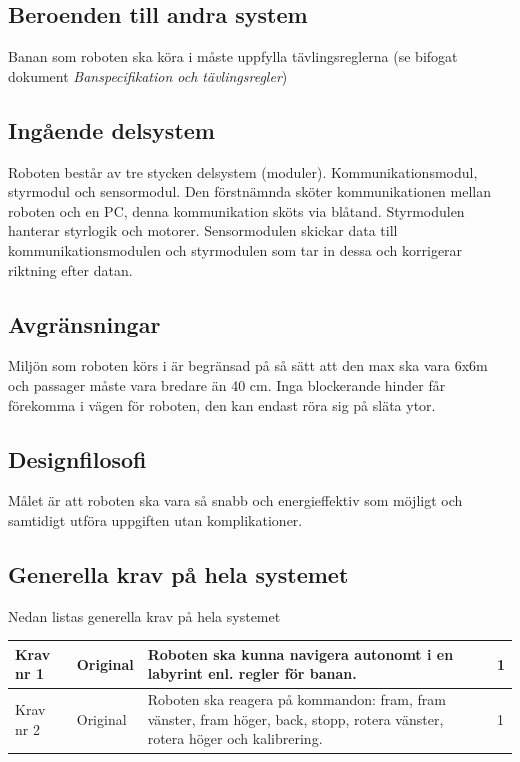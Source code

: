 \documentclass[11pt]{article}
\begin{document}
\begin{flushleft}
\subsection{Beroenden till andra system}
Banan som roboten ska köra i måste uppfylla tävlingsreglerna (se bifogat dokument \textit{Banspecifikation och tävlingsregler})

\subsection{Ingående delsystem}
Roboten består av tre stycken delsystem (moduler). Kommunikationsmodul, styrmodul och sensormodul. Den förstnämnda sköter kommunikationen mellan roboten och en PC, denna kommunikation sköts via blåtand. Styrmodulen hanterar styrlogik och motorer. Sensormodulen skickar data till kommunikationsmodulen och styrmodulen som tar in dessa och korrigerar riktning efter datan.

\subsection{Avgränsningar}
Miljön som roboten körs i är begränsad på så sätt att den max ska vara 6x6m och passager måste vara bredare än 40 cm. Inga blockerande hinder får förekomma i vägen för roboten, den kan endast röra sig på släta ytor.

\subsection{Designfilosofi}
Målet är att roboten ska vara så snabb och energieffektiv som möjligt och samtidigt utföra uppgiften utan komplikationer. 

\subsection{Generella krav på hela systemet}
Nedan listas generella krav på hela systemet
\\
\begin{center}
\begin{longtable}{|l|l|p{.70\linewidth}|l|} \hline

Krav nr 1 & 
Original & 
Roboten ska kunna navigera autonomt i en labyrint enl. regler för banan. & 
1 \\ \hline

Krav nr 2 & 
Original & 
Roboten ska reagera på kommandon: fram, fram vänster, fram höger, back, stopp, rotera vänster, rotera höger och kalibrering. & 
1 \\ \hline


\end{longtable}
\end{center}
\end{flushleft}
\end{document}
